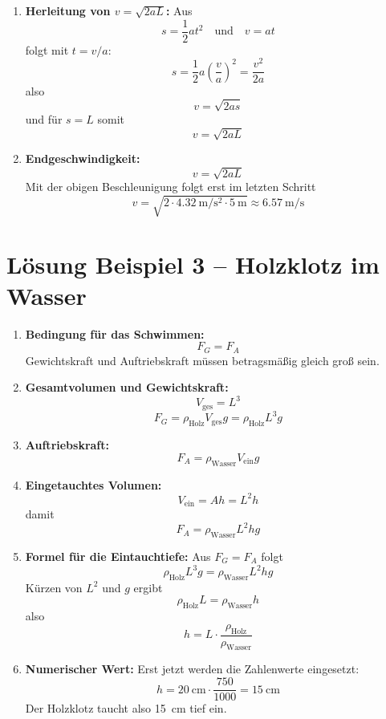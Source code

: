 \documentclass[11pt, a4paper]{article}
\begin{document}
\begin{enumerate}
    \item \textbf{Herleitung von $v = \sqrt{2aL}$:}
    Aus
    \[
        s = \frac{1}{2}at^2 \quad \text{und} \quad v = at
    \]
    folgt mit $t = v/a$:
    \[
        s = \frac{1}{2}a\left(\frac{v}{a}\right)^2 = \frac{v^2}{2a}
    \]
    also
    \[
        v = \sqrt{2as}
    \]
    und für $s=L$ somit
    \[
        v = \sqrt{2aL}
    \]

    \item \textbf{Endgeschwindigkeit:} \[
        v = \sqrt{2aL}
    \]
    Mit der obigen Beschleunigung folgt erst im letzten Schritt
    \[
        v = \sqrt{2 \cdot \SI{4.32}{\metre\per\second\squared} \cdot \SI{5}{\metre}} \approx \SI{6.57}{\metre\per\second}
    \]
\end{enumerate}

\newpage

\section*{Lösung Beispiel 3 -- Holzklotz im Wasser}
\begin{enumerate}
    \item \textbf{Bedingung für das Schwimmen:} \[
        F_G = F_A
    \]
    Gewichtskraft und Auftriebskraft müssen betragsmäßig gleich groß sein.

    \item \textbf{Gesamtvolumen und Gewichtskraft:} \[
        V_{\text{ges}} = L^3
    \]
    \[
        F_G = \rho_{\text{Holz}} V_{\text{ges}} g = \rho_{\text{Holz}} L^3 g
    \]

    \item \textbf{Auftriebskraft:} \[
        F_A = \rho_{\text{Wasser}} V_{\text{ein}} g
    \]

    \item \textbf{Eingetauchtes Volumen:} \[
        V_{\text{ein}} = A h = L^2 h
    \]
    damit \[
        F_A = \rho_{\text{Wasser}} L^2 h g
    \]

    \item \textbf{Formel für die Eintauchtiefe:}
    Aus $F_G = F_A$ folgt
    \[
        \rho_{\text{Holz}} L^3 g = \rho_{\text{Wasser}} L^2 h g
    \]
    Kürzen von $L^2$ und $g$ ergibt
    \[
        \rho_{\text{Holz}} L = \rho_{\text{Wasser}} h
    \]
    also
    \[
        h = L \cdot \frac{\rho_{\text{Holz}}}{\rho_{\text{Wasser}}}
    \]

    \item \textbf{Numerischer Wert:} Erst jetzt werden die Zahlenwerte eingesetzt:
    \[
        h = \SI{20}{\centi\metre} \cdot \frac{750}{1000} = \SI{15}{\centi\metre}
    \]
    Der Holzklotz taucht also \SI{15}{\centi\metre} tief ein.
\end{enumerate}
\end{document}
